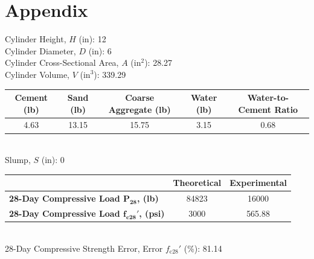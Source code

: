 \documentclass{article}
\begin{document}
    \section{Appendix}
    \begin{center}
        Cylinder Height, \(H\) (in): 12\\
        Cylinder Diameter, \(D\) (in): 6\\
        Cylinder Cross-Sectional Area, \(A\) (\(\text{in}^2\)): 28.27\\
        Cylinder Volume, \(V\) (\(\text{in}^3\)): 339.29\\
        \vspace{5mm}
        \begin{tabular}{|c|c|c|c|c|}
            \hline
            \textbf{Cement (lb)} & \textbf{Sand (lb)} & \textbf{Coarse Aggregate (lb)} & \textbf{Water (lb)} & \textbf{Water-to-Cement Ratio} \\\hline
            4.63 & 13.15 & 15.75 & 3.15 & 0.68 \\\hline
        \end{tabular}
        \vspace{5mm}
        \\Slump, \(S\) (in): 0\\
        \vspace{5mm}
        \begin{tabular}{|l|c|c|}
            \hline
            & \textbf{Theoretical} & \textbf{Experimental} \\\hline
            \textbf{28-Day Compressive Load \(\bm{P_{28}}\), (lb)} & 84823 & 16000 \\
            \textbf{28-Day Compressive Load \(\bm{f_{\textbf{c28}}'}\), (psi)} & 3000 & 565.88 \\\hline
        \end{tabular}
        \vspace{5mm}
        \\28-Day Compressive Strength Error, Error \(f_{\text{c28}}'\) (\%): 81.14
    \end{center}
\end{document}
